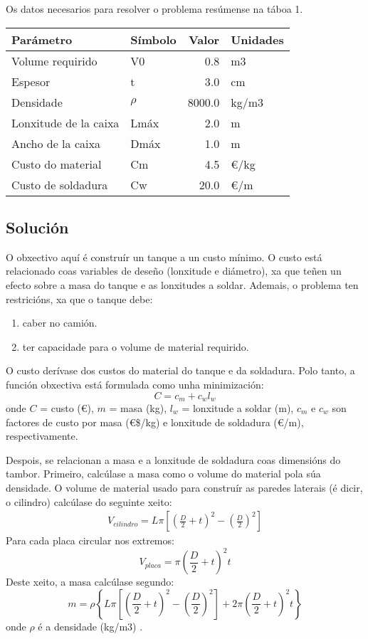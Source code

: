 \documentclass[
  letterpaper,
  DIV=11,
  numbers=noendperiod]{scrartcl}
\providecommand{\tightlist}{%
  \setlength{\itemsep}{0pt}\setlength{\parskip}{0pt}}\usepackage{longtable,booktabs,array}
\begin{document}
Os datos necesarios para resolver o problema resúmense na táboa 1.

\begin{longtable}[]{@{}llrl@{}}
\toprule()
Parámetro & Símbolo & Valor & Unidades \\
\midrule()
\endhead
Volume requirido & V0 & 0.8 & m3 \\
Espesor & t & 3.0 & cm \\
Densidade & \(\rho\) & 8000.0 & kg/m3 \\
Lonxitude de la caixa & Lmáx & 2.0 & m \\
Ancho de la caixa & Dmáx & 1.0 & m \\
Custo do material & Cm & 4.5 & €/kg \\
Custo de soldadura & Cw & 20.0 & €/m \\
\bottomrule()
\end{longtable}

\hypertarget{soluciuxf3n}{%
\subsection{Solución}\label{soluciuxf3n}}

O obxectivo aquí é construír un tanque a un custo mínimo. O custo está
relacionado coas variables de deseño (lonxitude e diámetro), xa que
teñen un efecto sobre a masa do tanque e as lonxitudes a soldar.
Ademais, o problema ten restricións, xa que o tanque debe:

\begin{enumerate}
\def\labelenumi{\arabic{enumi}.}
\tightlist
\item
  caber no camión.
\item
  ter capacidade para o volume de material requirido.
\end{enumerate}

O custo derívase dos custos do material do tanque e da soldadura. Polo
tanto, a función obxectiva está formulada como unha minimización: \[
C = c_m+c_w l_w
\] onde \(C\) = custo (€), \(m\) = masa (kg), \(l_w\) = lonxitude a
soldar (m), \(c_m\) e \(c_w\) son factores de custo por masa (€\$/kg) e
lonxitude de soldadura (\hspace{0pt}€/m), respectivamente.

Despois, se relacionan a masa e a lonxitude de soldadura coas dimensións
do tambor. Primeiro, calcúlase a masa como o volume do material pola súa
densidade. O volume de material usado para construír as paredes laterais
(é dicir, o cilindro) calcúlase do seguinte xeito: \[
\begin{align*}
V_{cilindro} = L \pi \left [ {\left ( \frac {D}{2} + t \right )}^2 - {\left ( \frac {D}{2} \right )}^2 \right ]
\end{align*}
\] Para cada placa circular nos extremos: \[
V_{placa} = \pi { \left ( \frac {D}{2} +t  \right )}^2 t
\] Deste xeito, a masa calcúlase segundo: \[
m=\rho\left\{L \pi\left[\left(\frac{D}{2}+t\right)^{2}-\left(\frac{D}{2}\right)^{2}\right]+2 \pi\left(\frac{D}{2}+t\right)^{2} t\right\}
\] onde \(\rho\) é a densidade (kg/m3) .
\end{document}
